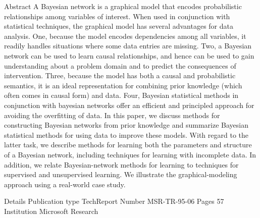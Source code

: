 Abstract
A Bayesian network is a graphical model that encodes probabilistic relationships among variables of interest. 
When used in conjunction with statistical techniques, the graphical model has several advantages for data analysis. 
One, because the model encodes dependencies among all variables, it readily handles situations where some data entries 
are missing. Two, a Bayesian network can be used to learn causal relationships, and hence can be used to gain understanding about a problem domain and to predict the consequences of intervention. Three, because the model has both a causal and probabilistic semantics, it is an ideal representation for combining prior knowledge (which often comes in causal form) and data. Four, Bayesian statistical methods in conjunction with bayesian networks offer an efficient and principled approach for avoiding the overfitting of data. In this paper, we discuss methods for constructing Bayesian networks from prior knowledge and summarize Bayesian statistical methods for using data to improve these models. With regard to the latter task, we describe methods for learning both the parameters and structure of a Bayesian network, including techniques for learning with incomplete data. In addition, we relate Bayesian-network methods for learning to techniques for supervised and unsupervised learning. We illustrate the graphical-modeling approach using a real-world case study.

Details
Publication type	TechReport
Number	MSR-TR-95-06
Pages	57
Institution	Microsoft Research

